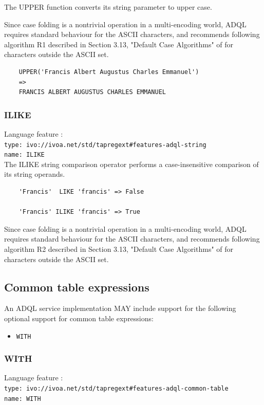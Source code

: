 \documentclass[11pt,a4paper]{ivoa}
\begin{document}
The UPPER function converts its string parameter to upper case.

Since case folding is a nontrivial operation in a multi-encoding world,
ADQL requires standard behaviour for the ASCII characters, and recommends
following algorithm R1 described in Section 3.13, "Default Case Algorithms"
of \citet{std:UNICODE} for characters outside the ASCII set.

\begin{verbatim}
    UPPER('Francis Albert Augustus Charles Emmanuel')
    =>
    FRANCIS ALBERT AUGUSTUS CHARLES EMMANUEL
\end{verbatim}

\subsubsection{ILIKE}
\label{sec:string.functions.ilike}
{\footnotesize Language feature :}\\
{\footnotesize \verb|type: ivo://ivoa.net/std/tapregext#features-adql-string|}\\
{\footnotesize \verb|name: ILIKE|}\\

The ILIKE string comparison operator performs a case-insensitive comparison
of its string operands.

\begin{verbatim}
    'Francis'  LIKE 'francis' => False

    'Francis' ILIKE 'francis' => True
\end{verbatim}

Since case folding is a nontrivial operation in a multi-encoding world,
ADQL requires standard behaviour for the ASCII characters, and recommends
following algorithm R2 described in Section 3.13, "Default Case Algorithms"
of \citet{std:UNICODE} for characters outside the ASCII set.

\subsection{Common table expressions}
\label{sec:common-table}

An ADQL service implementation MAY include support for the following optional
support for common table expressions:

\begin{itemize}
    \item \verb:WITH:
\end{itemize}

\subsubsection{WITH}
{\footnotesize Language feature :}\\
{\footnotesize \verb|type: ivo://ivoa.net/std/tapregext#features-adql-common-table|}\\
{\footnotesize \verb|name: WITH|}\\
\end{document}
